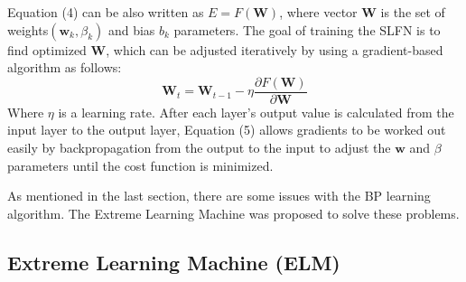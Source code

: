 \documentclass[a4paper, 14pt]{extarticle}
\begin{document}
Equation (4) can be also written as \( E = F(\mathbf{W})\), where vector \( \mathbf{W}\) is the set of weights\((\mathbf{w}_k, \beta_k)\) and bias \(b_k\) parameters\cite{G.B.Huang-ICNN}. The goal of training the SLFN is to find optimized \(\mathbf{W}\), which can be adjusted iteratively by using a gradient-based algorithm as follows\cite{G.B.Huang-ICNN}: 
\begin{equation}
    \mathbf{W}_t = \mathbf{W}_{t-1} - \eta\frac{\partial F(\mathbf{W})}{\partial \mathbf{W}}
\end{equation}
Where $\eta$ is a learning rate. After each layer's output value is calculated from the input layer to the output layer, Equation (5) allows gradients to be worked out easily by backpropagation from the output to the input to adjust the \(\mathbf{w}\) and \(\beta\) parameters until the cost function is minimized. 
\par As mentioned in the last section, there are some issues with the BP learning algorithm. The Extreme Learning Machine was proposed to solve these problems.
\subsection{Extreme Learning Machine (ELM)}
\end{document}
